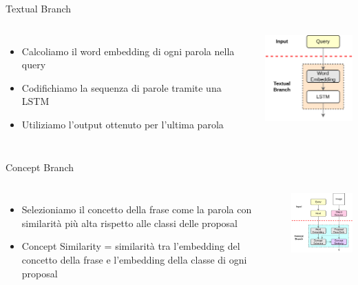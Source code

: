 \documentclass{beamer}
\begin{document}
\begin{frame}{Textual Branch}
  \begin{columns}
      \begin{itemize}
        \item Calcoliamo il \alert{word embedding} di ogni parola nella query
        \item Codifichiamo la \alert{sequenza} di parole tramite una LSTM
        \item Utiliziamo l'output ottenuto per \alert{l'ultima} parola
      \end{itemize}
      \centering
      \includegraphics[width=3.5cm]{images/textual-branch.png}
  \end{columns}
\end{frame}

\begin{frame}{Concept Branch}
  \begin{columns}
      \begin{itemize}
        \item Selezioniamo il \alert{concetto} della frase come la
        \alert{parola} con similarità più alta rispetto alle classi
        delle proposal
        \item Concept Similarity = similarità tra \alert{l'embedding del
        concetto} della frase e \alert{l'embedding della classe} di ogni
        proposal
      \end{itemize}
      \centering
      \includegraphics[width=4.5cm]{images/concept-branch.png}
  \end{columns}
\end{frame}
\end{document}
